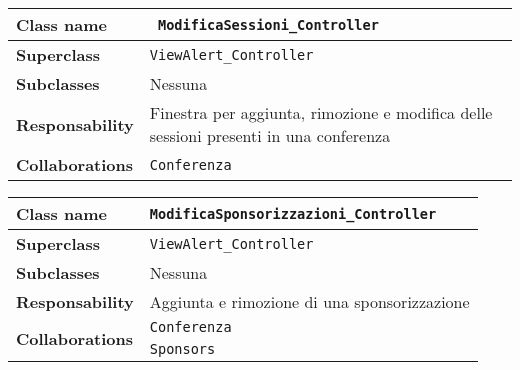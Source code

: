 \begin{table}[h!]
	\begin{tabular}{|l|l|}
		\hline 
		\textbf{Class name} &\texttt{ ModificaSessioni\_Controller}
		\\ \hline
		\textbf{Superclass} & \texttt{ViewAlert\_Controller}
		\\ \hline
		\multirow{1}{*}{\textbf{Subclasses}} & Nessuna
		\\ \hline
		\textbf{Responsability} & Finestra per aggiunta, rimozione e modifica delle sessioni presenti in una conferenza
		\\ \hline
		\multirow{1}{*}{\textbf{Collaborations}} & \texttt{Conferenza}
		\\ \hline
	\end{tabular}
\end{table}
\begin{table}[h!]
	\begin{tabular}{|l|l|}
		\hline 
		\textbf{Class name} & \texttt{ModificaSponsorizzazioni\_Controller}
		\\ \hline
		\textbf{Superclass} & \texttt{ViewAlert\_Controller}
		\\ \hline
		\multirow{1}{*}{\textbf{Subclasses}} & Nessuna
		\\ \hline
		\textbf{Responsability} & Aggiunta e rimozione di una sponsorizzazione
		\\ \hline
		\multirow{2}{*}{\textbf{Collaborations}} & \texttt{Conferenza} \\
		& \texttt{Sponsors	}	\\ \hline
	\end{tabular}
\end{table}
\clearpage
\pagebreak

